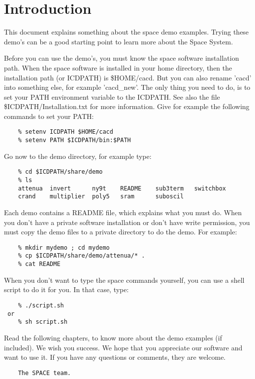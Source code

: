 \documentclass[11pt]{book}
\newcommand{\io}[1]{{\ttfamily #1}}
\begin{document}

\cacdmaketitle

\tableofcontents


\chapter{Introduction}

This document explains something about the space demo examples.
Trying these demo's
can be a good starting point to learn more about the Space System.

Before you can use the demo's, you must know the space software installation path.
When the space software is installed in your home directory, then the installation
path (or \io{ICDPATH}) is \io{\$HOME/cacd}.
But you can also rename 'cacd' into something else, for example 'cacd\_new'.
The only thing you need to do, is to set your \io{PATH} environment variable to the \io{ICDPATH}.
See also the file \io{\$ICDPATH/Installation.txt} for more information.
Give for example the following commands to set your \io{PATH}:
\begin{Verbatim}
    % setenv ICDPATH $HOME/cacd
    % setenv PATH $ICDPATH/bin:$PATH
\end{Verbatim}
Go now to the demo directory, for example type:
\begin{Verbatim}
    % cd $ICDPATH/share/demo
    % ls
    attenua  invert      ny9t    README    sub3term   switchbox
    crand    multiplier  poly5   sram      suboscil
\end{Verbatim}
Each demo contains a \io{README} file, which explains what you must do.
When you don't have a private software installation or don't have write permission,
you must copy the demo files to a private directory to do the demo.
For example:
\begin{Verbatim}
    % mkdir mydemo ; cd mydemo
    % cp $ICDPATH/share/demo/attenua/* .
    % cat README
\end{Verbatim}
When you don't want to type the space commands yourself,
you can use a shell script to do it for you.
In that case, type:
\begin{Verbatim}
    % ./script.sh
 or
    % sh script.sh
\end{Verbatim}
Read the following chapters, to know more about the demo examples (if included).
We wish you success.
We hope that you appreciate our software and want to use it.
If you have any questions or comments, they are welcome.
\begin{Verbatim}
    The SPACE team.
\end{Verbatim}












\end{document}
